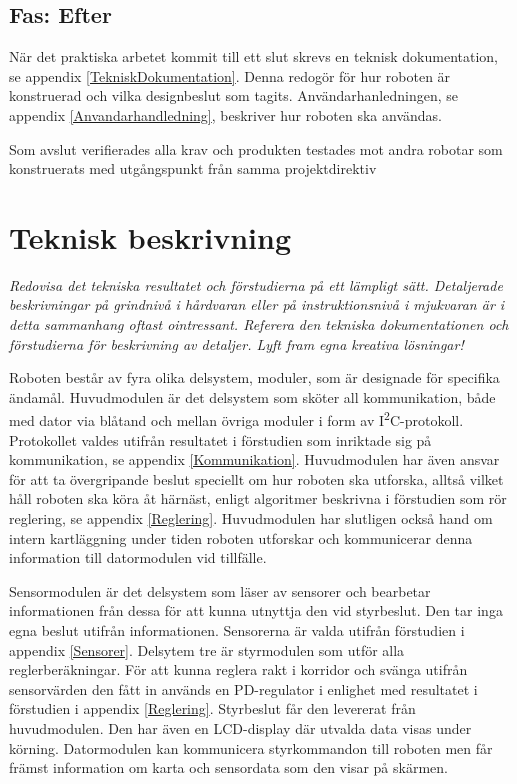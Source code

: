 \documentclass[11pt]{article}
\begin{document}
\begin{flushleft}
\subsection{Fas: Efter}
När det praktiska arbetet kommit till ett slut skrevs en teknisk dokumentation, se appendix \ref{TekniskDokumentation}. Denna redogör för hur roboten är konstruerad och vilka designbeslut som tagits. Användarhanledningen, se appendix \ref{Anvandarhandledning}, beskriver hur roboten ska användas.

Som avslut verifierades alla krav och produkten testades mot andra robotar som konstruerats med utgångspunkt från samma projektdirektiv

\pagebreak

\section{Teknisk beskrivning}
\textit{Redovisa det tekniska resultatet och förstudierna på ett lämpligt sätt. Detaljerade beskrivningar på grindnivå i hårdvaran eller på instruktionsnivå i mjukvaran är i detta sammanhang oftast ointressant. Referera den tekniska dokumentationen och förstudierna för beskrivning av detaljer. Lyft fram egna kreativa lösningar!}

Roboten består av fyra olika delsystem, moduler, som är designade för specifika ändamål. Huvudmodulen är det delsystem som sköter all kommunikation, både med dator via blåtand och mellan övriga moduler i form av I\textsuperscript{2}C-protokoll. Protokollet valdes utifrån resultatet i förstudien som inriktade sig på kommunikation, se appendix \ref{Kommunikation}. Huvudmodulen har även ansvar för att ta övergripande beslut speciellt om hur roboten ska utforska, alltså vilket håll roboten ska köra åt härnäst, enligt algoritmer beskrivna i förstudien som rör reglering, se appendix \ref{Reglering}. Huvudmodulen har slutligen också hand om intern kartläggning under tiden roboten utforskar och kommunicerar denna information till datormodulen vid tillfälle. 

Sensormodulen är det delsystem som läser av sensorer och bearbetar informationen från dessa för att kunna utnyttja den vid styrbeslut. Den tar inga egna beslut utifrån informationen. Sensorerna är valda utifrån förstudien i appendix \ref{Sensorer}. Delsytem tre är styrmodulen som utför alla reglerberäkningar. För att kunna reglera rakt i korridor och svänga utifrån sensorvärden den fått in används en PD-regulator i enlighet med resultatet i förstudien i appendix \ref{Reglering}. Styrbeslut får den levererat från huvudmodulen. Den har även en LCD-display där utvalda data visas under körning. Datormodulen kan kommunicera styrkommandon till roboten men får främst information om karta och sensordata som den visar på skärmen. 


\end{flushleft}
\end{document}
